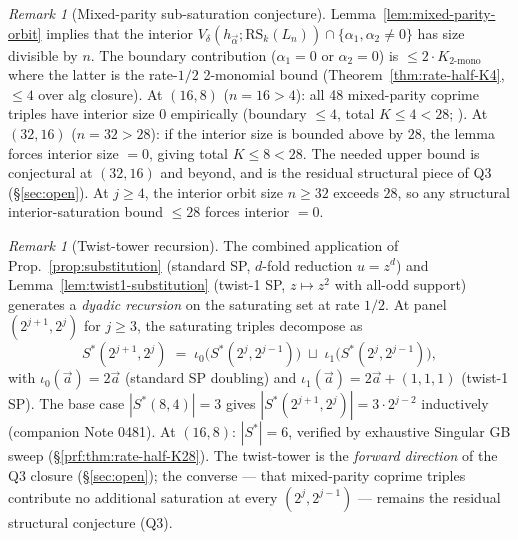 \documentclass[11pt]{article}
\theoremstyle{definition}
\theoremstyle{remark}
\newtheorem{remark}[theorem]{Remark}
\newcommand{\RS}{\mathrm{RS}}
\begin{document}
\begin{remark}[Mixed-parity sub-saturation conjecture]
\label{rem:mixed-parity-subsat}
Lemma~\ref{lem:mixed-parity-orbit} implies that the interior
$V_\delta(h_{\vec\alpha}; \RS_k(L_n)) \cap \{\alpha_1, \alpha_2 \neq 0\}$
has size divisible by $n$. The boundary contribution
($\alpha_1 = 0$ or $\alpha_2 = 0$) is $\leq 2 \cdot K_{2\text{-mono}}$
where the latter is the rate-$1/2$ 2-monomial bound
(Theorem~\ref{thm:rate-half-K4}, $\leq 4$ over alg closure). At
$(16, 8)$ ($n = 16 > 4$): all 48 mixed-parity coprime triples have
interior size $0$ empirically (boundary $\leq 4$, total $K \leq 4 < 28$;
\cite{CompanionRepo}). At $(32, 16)$ ($n = 32 > 28$): if the interior
size is bounded above by $28$, the lemma forces interior size $= 0$,
giving total $K \leq 8 < 28$. The needed upper bound is conjectural at
$(32, 16)$ and beyond, and is the residual structural piece of Q3
(\S\ref{sec:open}). At $j \geq 4$, the interior orbit size $n \geq 32$
exceeds $28$, so any structural interior-saturation bound $\leq 28$
forces interior $= 0$.
\end{remark}

\begin{remark}[Twist-tower recursion]
\label{rem:twist-tower}
The combined application of Prop.~\ref{prop:substitution} (standard SP,
$d$-fold reduction $u = z^d$) and Lemma~\ref{lem:twist1-substitution}
(twist-1 SP, $z \mapsto z^2$ with all-odd support) generates a
\emph{dyadic recursion} on the saturating set at rate $1/2$. At
panel $(2^{j+1}, 2^j)$ for $j \geq 3$, the saturating triples
decompose as
\[
 S^*(2^{j+1}, 2^j) \;=\; \iota_0\bigl(S^*(2^j, 2^{j-1})\bigr) \;\sqcup\; \iota_1\bigl(S^*(2^j, 2^{j-1})\bigr),
\]
with $\iota_0(\vec a) = 2 \vec a$ (standard SP doubling) and
$\iota_1(\vec a) = 2 \vec a + (1, 1, 1)$ (twist-1 SP). The base case
$|S^*(8, 4)| = 3$ gives $|S^*(2^{j+1}, 2^j)| = 3 \cdot 2^{j-2}$
inductively (companion Note 0481). At $(16, 8)$: $|S^*| = 6$,
verified by exhaustive Singular GB sweep
(\S\ref{prf:thm:rate-half-K28}). The twist-tower is the
\emph{forward direction} of the Q3 closure
(\S\ref{sec:open}); the converse — that mixed-parity coprime triples
contribute no additional saturation at every $(2^j, 2^{j-1})$ —
remains the residual structural conjecture (Q3).
\end{remark}
\end{document}
